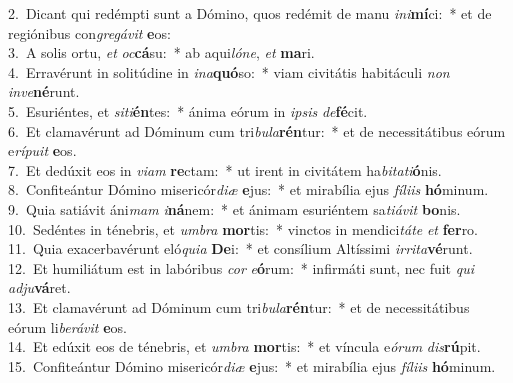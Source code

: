 {2.~}Dicant qui redémpti sunt a Dómino, quos redémit de manu \textit{i}\textit{ni}\textbf{mí}ci:~* et de regiónibus con\textit{gre}\textit{gá}\textit{vit} \textbf{e}os:\\
{3.~}A solis ortu, \textit{et} \textit{oc}\textbf{cá}su:~* ab aqui\textit{ló}\textit{ne}, \textit{et} \textbf{ma}ri.\\
{4.~}Erravérunt in solitúdine in \textit{i}\textit{na}\textbf{quó}so:~* viam civitátis habitáculi \textit{non} \textit{in}\textit{ve}\textbf{né}runt.\\
{5.~}Esuriéntes, et \textit{si}\textit{ti}\textbf{én}tes:~* ánima eórum in \textit{i}\textit{psis} \textit{de}\textbf{fé}cit.\\
{6.~}Et clamavérunt ad Dóminum cum tri\textit{bu}\textit{la}\textbf{rén}tur:~* et de necessitátibus eórum e\textit{rí}\textit{pu}\textit{it} \textbf{e}os.\\
{7.~}Et dedúxit eos in \textit{vi}\textit{am} \textbf{re}ctam:~* ut irent in civitátem ha\textit{bi}\textit{ta}\textit{ti}\textbf{ó}nis.\\
{8.~}Confiteántur Dómino misericór\textit{di}\textit{æ} \textbf{e}jus:~* et mirabília ejus \textit{fí}\textit{li}\textit{is} \textbf{hó}minum.\\
{9.~}Quia satiávit áni\textit{mam} \textit{i}\textbf{ná}nem:~* et ánimam esuriéntem sa\textit{ti}\textit{á}\textit{vit} \textbf{bo}nis.\\
{10.~}Sedéntes in ténebris, et \textit{um}\textit{bra} \textbf{mor}tis:~* vinctos in mendici\textit{tá}\textit{te} \textit{et} \textbf{fer}ro.\\
{11.~}Quia exacerbavérunt eló\textit{qui}\textit{a} \textbf{De}i:~* et consílium Altíssimi \textit{ir}\textit{ri}\textit{ta}\textbf{vé}runt.\\
{12.~}Et humiliátum est in labóribus \textit{cor} \textit{e}\textbf{ó}rum:~* infirmáti sunt, nec fuit \textit{qui} \textit{ad}\textit{ju}\textbf{vá}ret.\\
{13.~}Et clamavérunt ad Dóminum cum tri\textit{bu}\textit{la}\textbf{rén}tur:~* et de necessitátibus eórum li\textit{be}\textit{rá}\textit{vit} \textbf{e}os.\\
{14.~}Et edúxit eos de ténebris, et \textit{um}\textit{bra} \textbf{mor}tis:~* et víncula e\textit{ó}\textit{rum} \textit{dis}\textbf{rú}pit.\\
{15.~}Confiteántur Dómino misericór\textit{di}\textit{æ} \textbf{e}jus:~* et mirabília ejus \textit{fí}\textit{li}\textit{is} \textbf{hó}minum.\\

